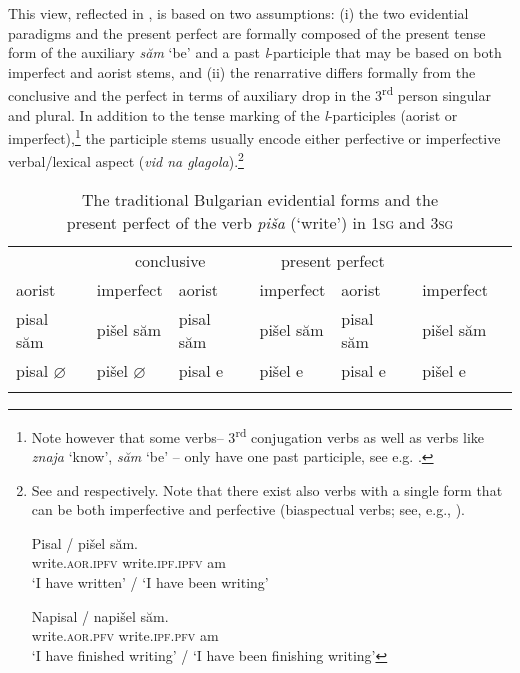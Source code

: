 \documentclass[output=paper,
colorlinks,
citecolor=brown,
newtxmath
]{langscibook}
\begin{document}
\noindent This view, reflected in , is based on two assumptions: (i) the two evidential paradigms and the present perfect are formally composed of the present tense form of the auxiliary \textit{săm} `be' and a past \textit{l}-participle that may be based on both imperfect and aorist stems, and (ii) the renarrative differs formally from the conclusive and the perfect in terms of auxiliary drop in the 3\textsuperscript{rd} person singular and plural.
In addition to the tense marking of the \textit{l}-participles (aorist or imperfect),\footnote{Note however that some verbs-- 3\textsuperscript{rd} conjugation verbs as well as verbs like \textit{znaja} `know',
 \textit{săm} `be' -- only have one past participle, see e.g. \citet{Nicolova2017}.}
the participle stems usually encode either perfective or imperfective verbal/lexical aspect (\textit{vid na glagola}).\footnote{See  and  respectively. Note that there exist also verbs with a single form that can be both imperfective and perfective (biaspectual verbs; see, e.g., \citealt{MacDonald.Markova2010,Rivero.Slavkov2014}).

\ea\label{ex:aorist-imperf-imperf}
\gll Pisal / pišel săm.\\
write.\textsc{aor.ipfv} {} write.\textsc{ipf.ipfv} am \\
\glt `I have written' / `I have been writing'
\z

\ea \label{ex:aorist-imperf-perf}
\gll Napisal / napišel săm. \\
write.\textsc{aor.pfv} {} write.\textsc{ipf.pfv} am \\
\glt `I have finished writing' / `I have been finishing writing'
\z}

\begin{table}[h]
\centering
 \begin{tabularx}{\textwidth}{XXXXXXX}
 \lsptoprule
 \multicolumn{2}{c}{renarrative} & \multicolumn{2}{c}{conclusive} & \multicolumn{2}{c}{present perfect}\\
aorist	    & imperfect	   & aorist  & imperfect & aorist & imperfect\\
 \midrule
pisal săm    & pišel săm	    & pisal săm  & pišel săm & pisal săm & pišel săm\\
pisal $\varnothing$	 & pišel $\varnothing$	 & pisal e	 & pišel e & pisal e & pišel e\\
 \lspbottomrule
 \end{tabularx}
 \caption{The traditional Bulgarian evidential forms and the\\ present perfect of the verb \textit{piša} (`write') in \textsc{1sg} and \textsc{3sg}}
 \label{tab:traditional}
\end{table}
\end{document}
